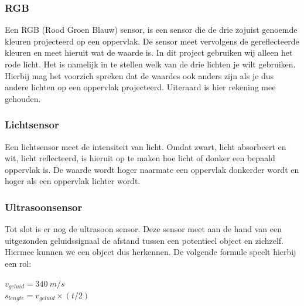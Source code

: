 \documentclass[12pt]{article}
\begin{document}
		\subsubsection{RGB}
			Een RGB (Rood Groen Blauw) sensor, is een sensor die de drie zojuist genoemde kleuren projecteerd op een oppervlak. De sensor meet vervolgens de gereflecteerde kleuren en meet hieruit wat de waarde is. In dit project gebruiken wij alleen het rode licht. Het is namelijk in te stellen welk van de drie lichten je wilt gebruiken. Hierbij mag het voorzich spreken dat de waardes ook anders zijn als je dus andere lichten op een oppervlak projecteerd. Uiteraard is hier rekening mee gehouden.
			
		\subsubsection{Lichtsensor}
			Een lichtsensor meet de intensiteit van licht. Omdat zwart, licht absorbeert en wit, licht reflecteerd, is hieruit op te maken hoe licht of donker een bepaald oppervlak is. De waarde wordt hoger naarmate een oppervlak donkerder wordt en hoger als een oppervlak lichter wordt.
			
		\subsubsection{Ultrasoonsensor}
			Tot slot is er nog de ultrasoon sensor. Deze sensor meet aan de hand van een uitgezonden geluidssignaal de afstand tussen een potentieel object en zichzelf. Hiermee kunnen we een object dus herkennen. De volgende formule speelt hierbij een rol:
			\begin{center}
				\Large $v_{geluid} = 340\ m/s$ \\
				\Large $s_{lengte} = v_{geluid} \times (t / 2)$
			\end{center}
		
\end{document}
